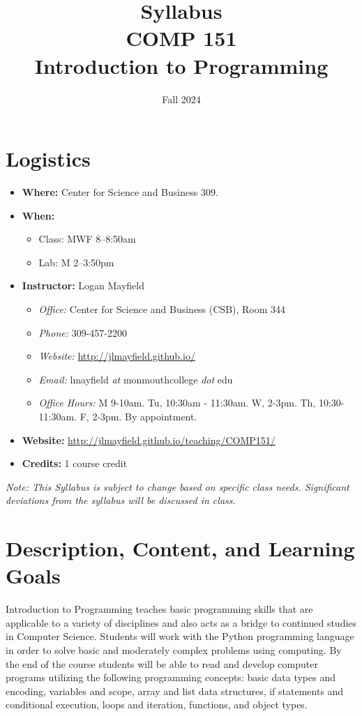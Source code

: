\documentclass[10pt]{article}
\title{Syllabus \\ COMP 151 \\ Introduction to Programming}
\author{  }
\date{Fall 2024}
\begin{document}
\maketitle

\section{Logistics}
\begin{itemize}
\item \textbf{Where: } Center for Science and Business 309.
\item \textbf{When: }
\begin{itemize}
  \item Class: MWF 8--8:50am
  \item Lab: M 2--3:50pm
\end{itemize}
\item \textbf{Instructor: } Logan Mayfield
\begin{itemize}
\item \textit{Office: } Center for Science and Business (CSB), Room 344
\item \textit{Phone: } 309-457-2200 %
\item \textit{Website: } \url{http://jlmayfield.github.io/}
\item \textit{Email: } lmayfield \textit{at} monmouthcollege \textit{dot} edu
\item \textit{Office Hours: }  M 9-10am. Tu, 10:30am - 11:30am. W, 2-3pm. Th, 10:30-11:30am. F, 2-3pm. By appointment.
\end{itemize}
\item \textbf{Website: } \url{http://jlmayfield.github.io/teaching/COMP151/}
\item \textbf{Credits: } 1 course credit
\end{itemize}
\emph{Note: This Syllabus is subject to change based on specific class needs. Significant deviations from the syllabus will be discussed in class.}


\section{Description, Content, and Learning Goals}

Introduction to Programming teaches basic programming skills that are applicable to a variety of disciplines and also acts as a bridge to continued studies in Computer Science. Students will work with the Python programming language in order to solve basic and moderately complex problems using computing. By the end of the course students will be able to read and develop computer programs utilizing the following programming concepts: basic data types and encoding, variables and scope, array and list data structures, if statements and conditional execution, loops and iteration, functions, and object types.
\end{document}
